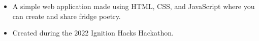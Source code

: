\begin{itemize}
  \item A simple web application made using HTML, CSS, and JavaScript where you can create and share fridge poetry.
  \item Created during the 2022 Ignition Hacks Hackathon.
\end{itemize}






